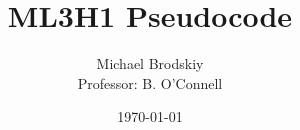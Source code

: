 


\title{ML3H1 Pseudocode}
\date{\today}
\author{Michael Brodskiy\\ \small Professor: B. O'Connell}



\maketitle

